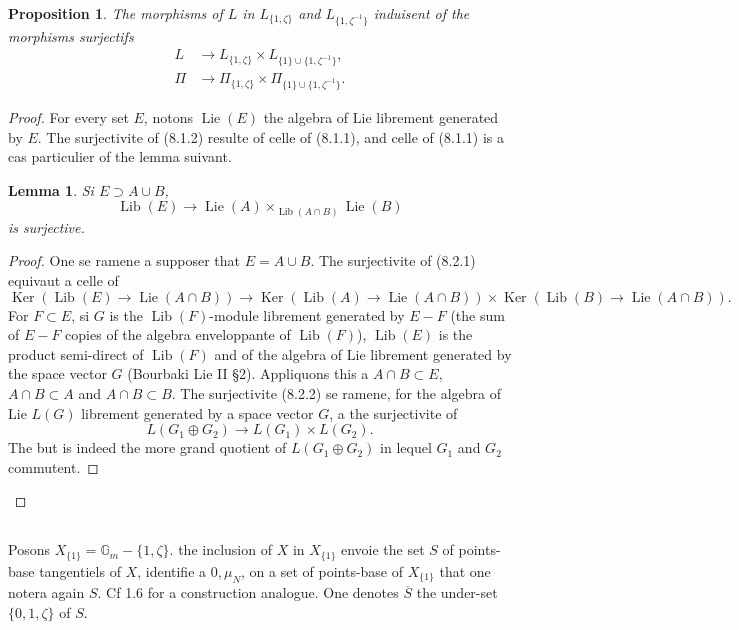 \documentclass[11pt,a4paper]{article}
\theoremstyle{plain}
\newtheorem{lemma}[theorem]{Lemma}
\newtheorem{proposition}[theorem]{Proposition}
\theoremstyle{definition}
\DeclareMathOperator{\Ker}{Ker}
\DeclareMathOperator{\Lie}{Lie}
\DeclareMathOperator{\Lib}{Lib}
\newcommand{\Gm}{\mathbb{G}_m}
\begin{document}
\begin{proposition}\label{prop:8.1}
The morphisms of $L$ in $L_{\{1,\zeta\}}$ and $L_{\{1,\zeta^{-1}\}}$ induisent of the morphisms surjectifs
\begin{align}
L &\to L_{\{1,\zeta\}} \times L_{\{1\} \cup \{1,\zeta^{-1}\}}, \label{eq:8.1.1}\\
\Pi &\to \Pi_{\{1,\zeta\}} \times \Pi_{\{1\} \cup \{1,\zeta^{-1}\}}. \label{eq:8.1.2}
\end{align}
\end{proposition}

\begin{proof}
For every set $E$, notons $\Lie(E)$ the algebra of Lie librement generated by $E$. The surjectivite of (8.1.2) resulte of celle of (8.1.1), and celle of (8.1.1) is a cas particulier of the lemma suivant.

\begin{lemma}\label{lem:8.2}
Si $E \supset A \cup B$,
\begin{equation}\label{eq:8.2.1}
\Lib(E) \to \Lie(A) \times_{\Lib(A \cap B)} \Lie(B)
\end{equation}
is surjective.
\end{lemma}

\begin{proof}
One se ramene a supposer that $E = A \cup B$. The surjectivite of (8.2.1) equivaut a celle of
\begin{equation}\label{eq:8.2.2}
\Ker(\Lib(E) \to \Lie(A \cap B)) \to \Ker(\Lib(A) \to \Lie(A \cap B)) \times \Ker(\Lib(B) \to \Lie(A \cap B)).
\end{equation}
For $F \subset E$, si $G$ is the $\Lib(F)$-module librement generated by $E - F$ (the sum of $E - F$ copies of the algebra enveloppante of $\Lib(F)$), $\Lib(E)$ is the product semi-direct of $\Lib(F)$ and of the algebra of Lie librement generated by the space vector $G$ (Bourbaki Lie II \S 2). Appliquons this a $A \cap B \subset E$, $A \cap B \subset A$ and $A \cap B \subset B$. The surjectivite (8.2.2) se ramene, for the algebra of Lie $L(G)$ librement generated by a space vector $G$, a the surjectivite of
\[
L(G_1 \oplus G_2) \to L(G_1) \times L(G_2).
\]
The but is indeed the more grand quotient of $L(G_1 \oplus G_2)$ in lequel $G_1$ and $G_2$ commutent.
\end{proof}
\end{proof}

\subsection{}
Posons $X_{\{1\}} = \Gm - \{1, \zeta\}$. the inclusion of $X$ in $X_{\{1\}}$ envoie the set $S$ of points-base tangentiels of $X$, identifie a $0, \mu_N$, on a set of points-base of $X_{\{1\}}$ that one notera again $S$. Cf 1.6 for a construction analogue. One denotes $\overline{S}$ the under-set $\{0, 1, \zeta\}$ of $S$.
\end{document}
